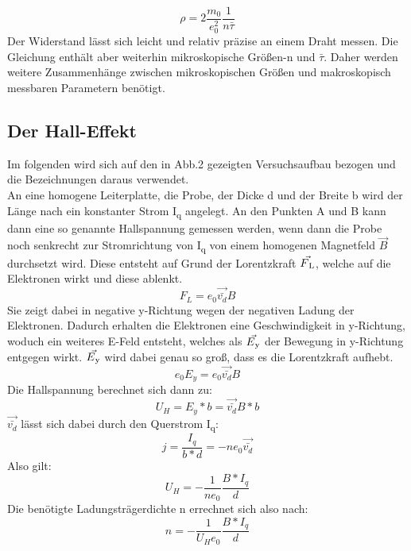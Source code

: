 \documentclass[titlepage=firstcover, captions=tableheading]{scrartcl}
\begin{document}
\begin{equation}
    \rho=2\frac{m_0}{e_0^2}\frac{1}{n\bar{\tau}}
\end{equation}
Der Widerstand lässt sich leicht und relativ präzise an einem Draht messen. Die Gleichung enthält aber weiterhin mikroskopische Größen-n und $\bar{\tau}$. Daher werden weitere Zusammenhänge zwischen mikroskopischen Größen und makroskopisch messbaren Parametern benötigt.

\subsection{Der Hall-Effekt}
Im folgenden wird sich auf den in Abb.2 gezeigten Versuchsaufbau bezogen und die Bezeichnungen daraus verwendet. \\
An eine homogene Leiterplatte, die Probe, der Dicke d und der Breite b wird der Länge nach ein konstanter Strom I\textsubscript{q} angelegt. An den Punkten A und B kann dann eine so genannte Hallspannung gemessen werden, wenn dann die Probe noch senkrecht zur Stromrichtung von I\textsubscript{q} von einem homogenen Magnetfeld $\vec{B}$ durchsetzt wird. Diese entsteht auf Grund der Lorentzkraft $\vec{F\textsubscript{L}}$, welche auf die Elektronen wirkt und diese ablenkt.
\begin{equation}
    F_L=e_0\vec{\bar{v_d}}B
\end{equation}
Sie zeigt dabei in negative y-Richtung wegen der negativen Ladung der Elektronen. Dadurch erhalten die Elektronen eine Geschwindigkeit in y-Richtung, woduch ein weiteres E-Feld entsteht, welches als $\vec{E\textsubscript{y}}$ der Bewegung in y-Richtung entgegen wirkt. $\vec{E\textsubscript{y}}$ wird dabei genau so groß, dass es die Lorentzkraft aufhebt.
\begin{equation}
    e_0E_y=e_0\vec{\bar{v_d}}B
\end{equation}
Die Hallspannung berechnet sich dann zu:
\begin{equation}
    U_H=E_y*b=\vec{\bar{v_d}}B*b
\end{equation}
$\vec{\bar{v_d}}$ lässt sich dabei durch den Querstrom I\textsubscript{q}:
\begin{equation}
    j=\frac{I_q}{b*d}=-ne_0\vec{\bar{v_d}}
\end{equation}
Also gilt:
\begin{equation}
    U_H=-\frac{1}{ne_0}\frac{B*I_q}{d}
\end{equation}
Die benötigte Ladungsträgerdichte n errechnet sich also nach:
\begin{equation}
    n=-\frac{1}{U_He_0}\frac{B*I_q}{d}
\end{equation}
\end{document}
